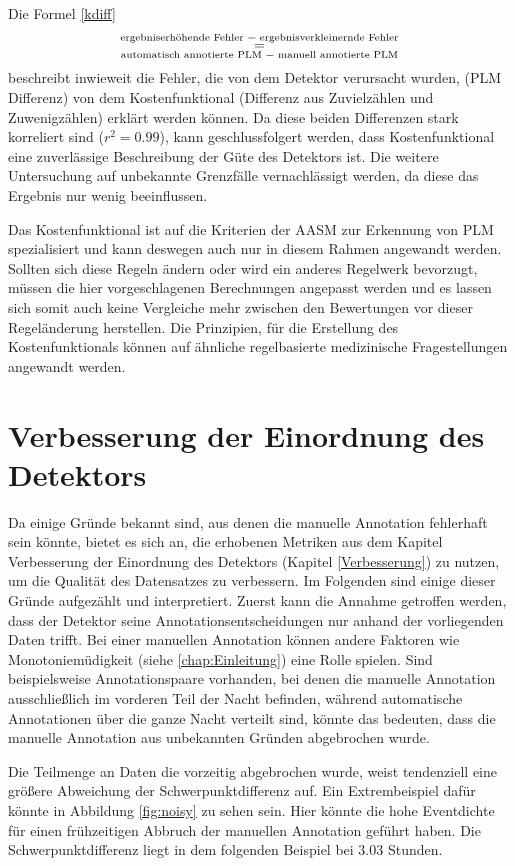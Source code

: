 Die Formel \ref{kdiff} $$
\overset{\text{ergebniserhöhende Fehler \textminus \ ergebnisverkleinernde Fehler}}{\underset{\text{automatisch annotierte PLM \textminus \ manuell annotierte PLM}}{=}}
$$
beschreibt inwieweit die Fehler, die von dem Detektor verursacht wurden, (PLM Differenz) von dem Kostenfunktional (Differenz aus Zuvielzählen und Zuwenigzählen) erklärt werden können. 
Da diese beiden Differenzen stark korreliert sind ($r^{2} = 0.99 $), kann geschlussfolgert werden, dass Kostenfunktional eine zuverlässige Beschreibung der Güte des Detektors ist.
Die weitere Untersuchung auf unbekannte Grenzfälle vernachlässigt werden, da diese das Ergebnis nur wenig beeinflussen.

Das Kostenfunktional ist auf die Kriterien der AASM zur Erkennung von PLM spezialisiert und kann deswegen auch nur in diesem Rahmen angewandt werden. Sollten sich diese Regeln ändern oder wird ein anderes Regelwerk bevorzugt, müssen die hier vorgeschlagenen Berechnungen angepasst werden und es lassen sich somit auch keine Vergleiche mehr zwischen den Bewertungen vor dieser Regeländerung herstellen. 
Die Prinzipien, für die Erstellung des Kostenfunktionals können auf ähnliche regelbasierte medizinische Fragestellungen angewandt werden. 


\section{Verbesserung der Einordnung des Detektors}
Da einige Gründe bekannt sind, aus denen die manuelle Annotation fehlerhaft sein könnte, bietet es sich an, die erhobenen Metriken aus dem Kapitel Verbesserung der Einordnung  des Detektors (Kapitel \ref{Verbesserung}) zu nutzen, um die Qualität des Datensatzes zu verbessern. 
Im Folgenden sind einige dieser Gründe aufgezählt und interpretiert.
Zuerst kann die Annahme getroffen werden, dass der Detektor seine Annotationsentscheidungen nur anhand der vorliegenden Daten trifft. Bei einer manuellen Annotation können andere Faktoren wie Monotoniemüdigkeit (siehe \ref{chap:Einleitung}) eine Rolle spielen. Sind beispielsweise Annotationspaare vorhanden, bei denen die manuelle Annotation ausschließlich im vorderen Teil der Nacht befinden, während automatische Annotationen über die ganze Nacht verteilt sind, könnte das bedeuten, dass die manuelle Annotation aus unbekannten Gründen abgebrochen wurde.

Die Teilmenge an Daten die vorzeitig abgebrochen wurde, weist tendenziell eine größere Abweichung der Schwerpunktdifferenz auf. Ein Extrembeispiel dafür könnte in Abbildung \ref{fig:noisy} zu sehen sein. Hier könnte die hohe Eventdichte für einen frühzeitigen Abbruch der manuellen Annotation geführt haben. Die Schwerpunktdifferenz liegt in dem folgenden Beispiel bei 3.03 Stunden.


